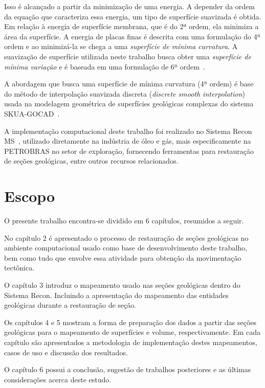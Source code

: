 Isso é alcançado a partir da minimização de uma energia. A depender da ordem da equação que caracteriza essa energia, um tipo de superfície suavizada é obtida. Em relação à energia de superfície membrana, que é do 2ª ordem, ela minimiza a área da superfície. A energia de placas finas é descrita com uma formulação do 4ª ordem e ao minimizá-la se chega a uma \emph{superfície de mínima curvatura}. A suavização de superfície utilizada neste trabalho busca obter uma \emph{superfície de mínima variação} e é baseada em uma formulação de 6ª ordem~\cite{Botsch}.

A abordagem que busca uma superfície de mínima curvatura (4ª ordem) é base do método de interpolação suavizada discreta (\emph{discrete smooth interpolation})~\cite{DSI} usada na modelagem geométrica de superfícies geológicas complexas do sistema SKUA-GOCAD~\cite{GOCAD}.

A implementação computacional deste trabalho foi realizado no Sistema Recon MS~\cite{ReconTecgraf}, utilizado diretamente na indústria de óleo e gás, mais especificamente na PETROBRAS no setor de exploração, fornecendo ferramentas para restauração de seções geológicas, entre outros recursos relacionados.

\section{Escopo}

O presente trabalho encontra-se dividido em 6 capítulos, resumidos a seguir.

No capítulo 2 é apresentado o processo de restauração de seções geológicas no ambiente computacional usado como base de desenvolvimento deste trabalho, bem como tudo que envolve essa atividade para obtenção da movimentação tectônica.

O capítulo 3 introduz o mapeamento usado nas seções geológicas dentro do Sistema Recon. Incluindo a apresentação do mapeamento das entidades geológicas durante a restauração de seção.

Os capítulos 4 e 5 mostram a forma de preparação dos dados a partir das seções geológicas para o mapeamento de superfícies e volume, respectivamente. Em cada capítulo são apresentados a metodologia de implementação destes mapeamentos, casos de uso e discussão dos resultados.

O capítulo 6 possui a conclusão, sugestão de trabalhos posteriores e as últimas considerações acerca deste estudo.